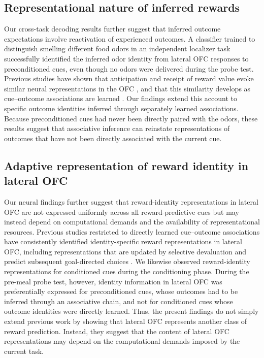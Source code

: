 \documentclass[12pt,letterpaper]{article}
\begin{document}
\subsection*{Representational nature of inferred rewards}

Our cross-task decoding results further suggest that inferred outcome expectations involve reactivation of experienced outcomes. A classifier trained to distinguish smelling different food odors in an independent localizer task successfully identified the inferred odor identity from lateral OFC responses to preconditioned cues, even though no odors were delivered during the probe test. Previous studies have shown that anticipation and receipt of reward value evoke similar neural representations in the OFC \citep{RN1}, and that this similarity develops as cue--outcome associations are learned \citep{kahnt2011decoding}. Our findings extend this account to specific outcome identities inferred through separately learned associations. Because preconditioned cues had never been directly paired with the odors, these results suggest that associative inference can reinstate representations of outcomes that have not been directly associated with the current cue.


\subsection*{Adaptive representation of reward identity in lateral OFC}

Our neural findings further suggest that reward-identity representations in lateral OFC are not expressed uniformly across all reward-predictive cues but may instead depend on computational demands and the availability of representational resources. Previous studies restricted to directly learned cue--outcome associations have consistently identified identity-specific reward representations in lateral OFC, including representations that are updated by selective devaluation and predict subsequent goal-directed choices \citep{howard2015identity,howard2017identity,howard2018identity,liuyaoatt24,witkowski2026identity}. We likewise observed reward-identity representations for conditioned cues during the conditioning phase. During the pre-meal probe test, however, identity information in lateral OFC was preferentially expressed for preconditioned cues, whose outcomes had to be inferred through an associative chain, and not for conditioned cues whose outcome identities were directly learned. Thus, the present findings do not simply extend previous work by showing that lateral OFC represents another class of reward prediction. Instead, they suggest that the content of lateral OFC representations may depend on the computational demands imposed by the current task.
\end{document}
